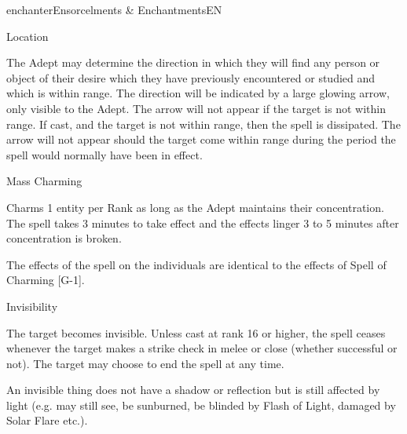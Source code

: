 \begin{College}[1.1]{enchanter}{Ensorcelments \& Enchantments}{EN}
\begin{spell}[G-6]{Location}

\begin{effects}
The Adept may determine the direction in which they will find any
person or object of their desire which they have previously
encountered or studied and which is within range.  The direction will
be indicated by a large glowing arrow, only visible to the Adept.  The
arrow will not appear if the target is not within range. If cast, and
the target is not within range, then the spell is dissipated. The
arrow will not appear should the target come within range during the
period the spell would normally have been in effect.
\end{effects}
\end{spell}

\begin{spell}[G-7]{Mass Charming}

\begin{effects}
Charms 1 entity per Rank as long as the Adept maintains their
concentration.  The spell takes 3 minutes to take effect and the
effects linger 3 to 5 minutes after concentration is broken.

The effects of the spell on the individuals are identical to the
effects of Spell of Charming [G-1].
\end{effects}
\end{spell}

\begin{spell}[G-8]{Invisibility}
\begin{effects}
The target becomes invisible.  Unless cast at rank 16 or higher, the
spell ceases whenever the target makes a strike check in melee or
close (whether successful or not). The target may choose to end the
spell at any time.

An invisible thing does not have a shadow or reflection but is still
affected by light (e.g.  may still see, be sunburned, be blinded by
Flash of Light, damaged by Solar Flare etc.).


\end{effects}
\end{spell}
\end{College}
